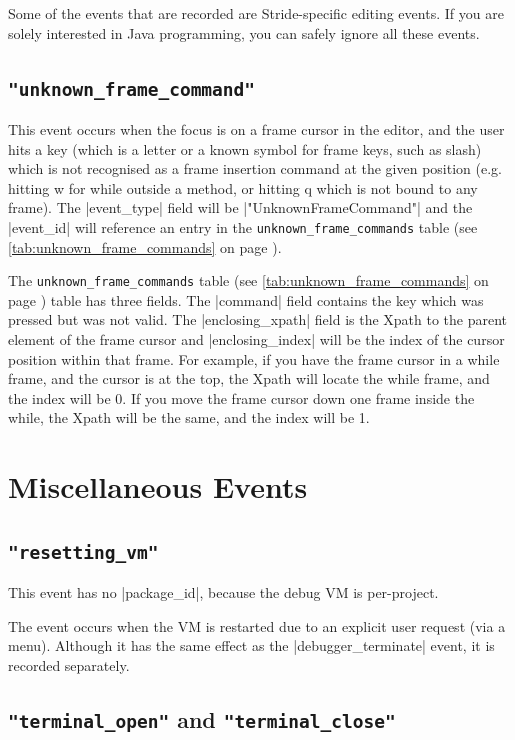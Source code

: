\documentclass{report}
\newcommand{\myref}[1]{\autoref{#1} on page \pageref*{#1}}
\newcommand{\tabref}[1]{\lstinline|#1| table (see \myref{tab:#1})}
\begin{document}
Some of the events that are recorded are Stride-specific editing events.  If you are solely interested
in Java programming, you can safely ignore all these events.

\subsection{\lstinline!"unknown_frame_command"!}

This event occurs when the focus is on a frame cursor in the editor, and the user hits a key
(which is a letter or a known symbol for frame keys, such as slash) which is not recognised as a
frame insertion command at the given position (e.g. hitting w for while outside a method, or
hitting q which is not bound to any frame).  The |event_type| field will be |"UnknownFrameCommand"|
and the |event_id| will reference an entry in the \tabref{unknown_frame_commands}.


The \tabref{unknown_frame_commands} table has three fields.  The |command| field contains the key which
was pressed but was not valid.  The |enclosing_xpath| field is the Xpath to the parent element of the
 frame cursor and |enclosing_index| will be the index of the cursor position within that frame.  For
 example, if you have the frame cursor in a while frame, and the cursor is at the top, the Xpath
 will locate the while frame, and the index will be 0.  If you move the frame cursor down one
 frame inside the while, the Xpath will be the same, and the index will be 1.

\section{Miscellaneous Events}

\subsection{\lstinline!"resetting_vm"!}

This event has no |package_id|, because the debug VM is per-project.

The event occurs when the VM is restarted due to an explicit user request (via
a menu).  Although it has the same effect as the |debugger_terminate| event,
it is recorded separately.

\subsection{\lstinline!"terminal_open"! and \lstinline!"terminal_close"!}
\end{document}
